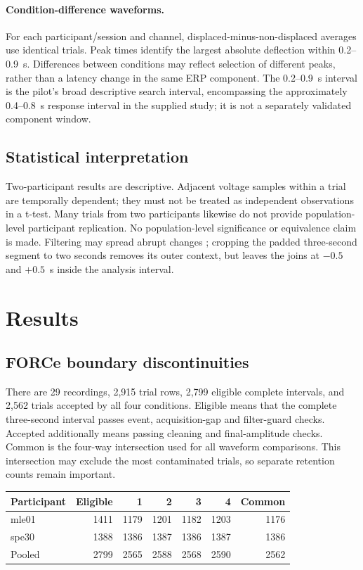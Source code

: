 \documentclass[11pt,a4paper]{article}
\begin{document}
\paragraph{Condition-difference waveforms.} For each participant/session and channel, displaced-minus-non-displaced averages use identical trials. Peak times identify the largest absolute deflection within 0.2--0.9~s. Differences between conditions may reflect selection of different peaks, rather than a latency change in the same ERP component. The 0.2--0.9~s interval is the pilot's broad descriptive search interval, encompassing the approximately 0.4--0.8~s response interval in the supplied study; it is not a separately validated component window.
\subsection{Statistical interpretation}
Two-participant results are descriptive. Adjacent voltage samples within a trial are temporally dependent; they must not be treated as independent observations in a t-test. Many trials from two participants likewise do not provide population-level participant replication. No population-level significance or equivalence claim is made. Filtering may spread abrupt changes \cite{widmann}; cropping the padded three-second segment to two seconds removes its outer context, but leaves the joins at $-0.5$ and $+0.5$~s inside the analysis interval.
\section{Results}\subsection{FORCe boundary discontinuities}
There are 29 recordings, 2,915 trial rows, 2,799 eligible complete intervals, and 2,562 trials accepted by all four conditions. Eligible means that the complete three-second interval passes event, acquisition-gap and filter-guard checks. Accepted additionally means passing cleaning and final-amplitude checks. Common is the four-way intersection used for all waveform comparisons. This intersection may exclude the most contaminated trials, so separate retention counts remain important.
\begin{center}\small\begin{tabular}{lrrrrrr}\toprule
Participant & Eligible & 1 & 2 & 3 & 4 & Common \\
\midrule
mle01 & 1411 & 1179 & 1201 & 1182 & 1203 & 1176 \\
spe30 & 1388 & 1386 & 1387 & 1386 & 1387 & 1386 \\
Pooled & 2799 & 2565 & 2588 & 2568 & 2590 & 2562 \\
\bottomrule\end{tabular}\end{center}
\end{document}
